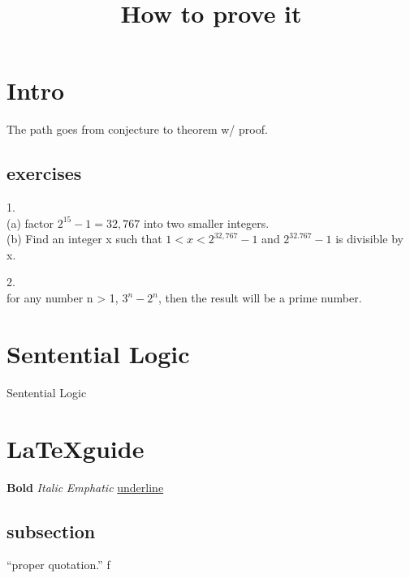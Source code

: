 \documentclass{article}
\title{How to prove it}
\begin{document}
\maketitle

\section{Intro}
The path goes from conjecture to theorem w/ proof.

\subsection{exercises}
1.\\
(a) factor $2^{15} - 1 = 32,767$ into two smaller integers.\\
(b) Find an integer x such that $ 1 < x < 2^{32,767} - 1$  and $2^{32.767} - 1 $ is
divisible by x.

2.\\
for any number n > 1, $ 3^n - 2^n $, then the result will be a prime number.

\section{Sentential Logic}
Sentential Logic


\section{\LaTeX guide}
\textbf{Bold}
\textit{Italic}
\emph{Emphatic}
\underline{underline}
\subsection{subsection}

``proper quotation.''
f
\end{document}
